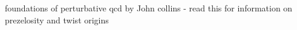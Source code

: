 foundations of perturbative qcd by John collins - read this for information on prezelosity and twist origins 